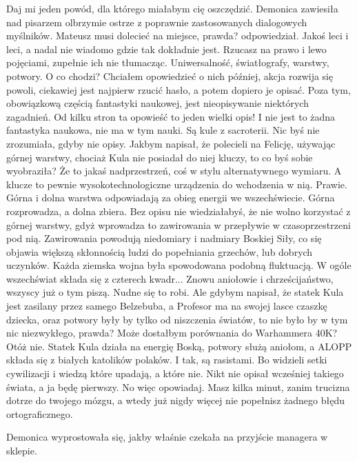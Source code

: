 \begin{dialogue}
\ds{} Daj mi jeden powód, dla którego miałabym cię oszczędzić. \dm{} Demonica zawiesiła nad pisarzem olbrzymie ostrze z poprawnie zastosowanych dialogowych myślników.
\ds{} Mateusz musi dolecieć na miejsce, prawda? \dm{} odpowiedział.
\ds{} Jakoś leci i leci, a nadal nie wiadomo gdzie tak dokładnie jest. Rzucasz na prawo i lewo pojęciami, zupełnie ich nie tłumacząc.
Uniwersalność, światłografy, warstwy, potwory. O co chodzi?
\ds{} Chciałem opowiedzieć o nich później, akcja rozwija się powoli, ciekawiej jest najpierw rzucić hasło, a potem dopiero je opisać.
Poza tym, obowiązkową częścią fantastyki naukowej, jest nieopisywanie niektórych zagadnień.
\ds{} Od kilku stron ta opowieść to jeden wielki opis! I nie jest to żadna fantastyka naukowa, nie ma w tym nauki. Są kule z sacroterii.
\ds{} Nic byś nie zrozumiała, gdyby nie opisy. Jakbym napisał, że polecieli na Felicję, używając górnej warstwy, chociaż Kula nie posiadał do niej kluczy, to co byś sobie wyobraziła?
\ds{} Że to jakaś nadprzestrzeń, coś w stylu alternatywnego wymiaru. A klucze to pewnie wysokotechnologiczne urządzenia do wchodzenia w nią.
\ds{} Prawie. Górna i dolna warstwa odpowiadają za obieg energii we wszechświecie. Górna rozprowadza, a dolna zbiera.
Bez opisu nie wiedziałabyś, że nie wolno korzystać z górnej warstwy, gdyż wprowadza to zawirowania w przepływie w czasoprzestrzeni pod nią.
Zawirowania powodują niedomiary i nadmiary Boskiej Siły, co się objawia większą skłonnością ludzi do popełniania grzechów, lub dobrych uczynków.
Każda ziemska wojna była spowodowana podobną fluktuacją.
W ogóle wszechświat składa się z czterech kwadr...
\ds{} Znowu aniołowie i chrześcijaństwo, wszyscy już o tym piszą. Nudne się to robi.
\ds{} Ale gdybym napisał, że statek Kula jest zasilany przez samego Belzebuba, a Profesor ma na swojej lasce czaszkę dziecka, oraz potwory były by tylko od niszczenia światów, to nie było by w tym nic niezwykłego, prawda? Może dostałbym porównania do Warhammera 40K? Otóż nie. Statek Kula działa na energię Boską, potwory służą aniołom, a ALOPP składa się z białych katolików polaków. 
I tak, są rasistami. Bo widzieli setki cywilizacji i wiedzą które upadają, a które nie.
Nikt nie opisał wcześniej takiego świata, a ja będę pierwszy.
\ds{} No więc opowiadaj. Masz kilka minut, zanim trucizna dotrze do twojego mózgu, a wtedy już nigdy więcej nie popełnisz żadnego błędu ortograficznego.
\end{dialogue}
Demonica wyprostowała się, jakby właśnie czekała na przyjście managera w sklepie.

